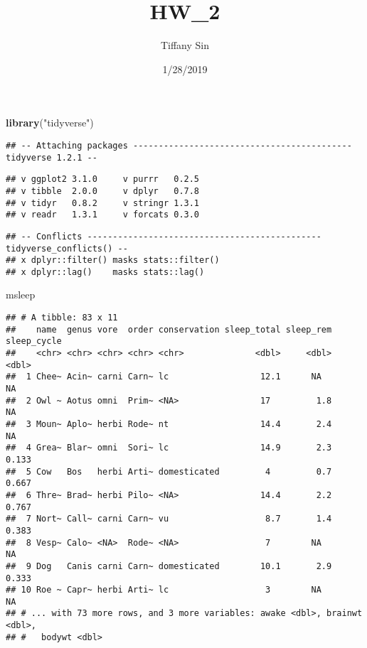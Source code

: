 \documentclass[]{article}
\title{HW\_2}
\author{Tiffany Sin}
\date{1/28/2019}
\newenvironment{Shaded}{\begin{snugshade}}{\end{snugshade}}
\newcommand{\KeywordTok}[1]{\textcolor[rgb]{0.13,0.29,0.53}{\textbf{#1}}}
\newcommand{\StringTok}[1]{\textcolor[rgb]{0.31,0.60,0.02}{#1}}
\newcommand{\NormalTok}[1]{#1}
\begin{document}
\maketitle

\begin{Shaded}
\begin{Highlighting}[]
\KeywordTok{library}\NormalTok{(}\StringTok{"tidyverse"}\NormalTok{)}
\end{Highlighting}
\end{Shaded}

\begin{verbatim}
## -- Attaching packages ------------------------------------------- tidyverse 1.2.1 --
\end{verbatim}

\begin{verbatim}
## v ggplot2 3.1.0     v purrr   0.2.5
## v tibble  2.0.0     v dplyr   0.7.8
## v tidyr   0.8.2     v stringr 1.3.1
## v readr   1.3.1     v forcats 0.3.0
\end{verbatim}

\begin{verbatim}
## -- Conflicts ---------------------------------------------- tidyverse_conflicts() --
## x dplyr::filter() masks stats::filter()
## x dplyr::lag()    masks stats::lag()
\end{verbatim}

\begin{Shaded}
\begin{Highlighting}[]
\NormalTok{msleep}
\end{Highlighting}
\end{Shaded}

\begin{verbatim}
## # A tibble: 83 x 11
##    name  genus vore  order conservation sleep_total sleep_rem sleep_cycle
##    <chr> <chr> <chr> <chr> <chr>              <dbl>     <dbl>       <dbl>
##  1 Chee~ Acin~ carni Carn~ lc                  12.1      NA        NA    
##  2 Owl ~ Aotus omni  Prim~ <NA>                17         1.8      NA    
##  3 Moun~ Aplo~ herbi Rode~ nt                  14.4       2.4      NA    
##  4 Grea~ Blar~ omni  Sori~ lc                  14.9       2.3       0.133
##  5 Cow   Bos   herbi Arti~ domesticated         4         0.7       0.667
##  6 Thre~ Brad~ herbi Pilo~ <NA>                14.4       2.2       0.767
##  7 Nort~ Call~ carni Carn~ vu                   8.7       1.4       0.383
##  8 Vesp~ Calo~ <NA>  Rode~ <NA>                 7        NA        NA    
##  9 Dog   Canis carni Carn~ domesticated        10.1       2.9       0.333
## 10 Roe ~ Capr~ herbi Arti~ lc                   3        NA        NA    
## # ... with 73 more rows, and 3 more variables: awake <dbl>, brainwt <dbl>,
## #   bodywt <dbl>
\end{verbatim}
\end{document}
